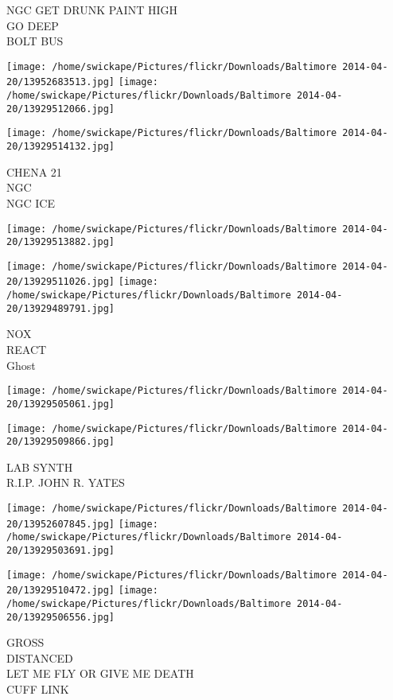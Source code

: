 \documentclass[10pt,letterpaper]{article}
\begin{document}
NGC GET DRUNK PAINT HIGH\\
GO DEEP\\
BOLT BUS
\pagebreak

\texttt{[image: /home/swickape/Pictures/flickr/Downloads/Baltimore 2014-04-20/13952683513.jpg]}
\texttt{[image: /home/swickape/Pictures/flickr/Downloads/Baltimore 2014-04-20/13929512066.jpg]}

\vspace{0.25in}
\texttt{[image: /home/swickape/Pictures/flickr/Downloads/Baltimore 2014-04-20/13929514132.jpg]}

CHENA 21\\
NGC\\
NGC ICE
\pagebreak

\texttt{[image: /home/swickape/Pictures/flickr/Downloads/Baltimore 2014-04-20/13929513882.jpg]}

\vspace{0.25in}
\texttt{[image: /home/swickape/Pictures/flickr/Downloads/Baltimore 2014-04-20/13929511026.jpg]}
\texttt{[image: /home/swickape/Pictures/flickr/Downloads/Baltimore 2014-04-20/13929489791.jpg]}

NOX\\
REACT\\
Ghost
\pagebreak

\texttt{[image: /home/swickape/Pictures/flickr/Downloads/Baltimore 2014-04-20/13929505061.jpg]}

\vspace{0.25in}
\texttt{[image: /home/swickape/Pictures/flickr/Downloads/Baltimore 2014-04-20/13929509866.jpg]}

LAB SYNTH\\
R.I.P. JOHN R. YATES
\pagebreak

\texttt{[image: /home/swickape/Pictures/flickr/Downloads/Baltimore 2014-04-20/13952607845.jpg]}
\texttt{[image: /home/swickape/Pictures/flickr/Downloads/Baltimore 2014-04-20/13929503691.jpg]}

\texttt{[image: /home/swickape/Pictures/flickr/Downloads/Baltimore 2014-04-20/13929510472.jpg]}
\texttt{[image: /home/swickape/Pictures/flickr/Downloads/Baltimore 2014-04-20/13929506556.jpg]}

GROSS\\
DISTANCED\\
LET ME FLY OR GIVE ME DEATH\\
CUFF LINK
\pagebreak
\end{document}
